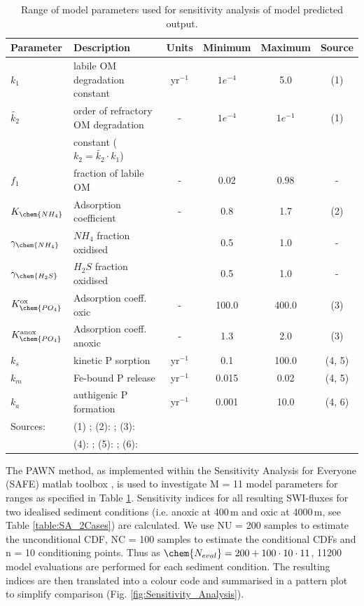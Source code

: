 \documentclass[gmd, manuscript]{copernicus}
\begin{document}
\begin{table}[btp]
\caption{Range of model parameters used for sensitivity analysis of model predicted output.} 
\centering
\begin{tabular}{l l c c c c}
\hline\hline
Parameter & Description & Units & Minimum  & Maximum & Source\\
\hline
$k_1$ & labile OM degradation constant & yr$^{-1}$ & $1e^{-4}$ & 5.0 & (1)\\
$\widetilde{k_2}$ & order of refractory OM degradation & - & $1e^{-4}$ & $1e^{-1}$ &  (1)\\
 & constant ($k_2 = \widetilde{k_2} \cdot k_1$) & & &  &\\
$f_1$ & fraction of labile OM & - & 0.02 & 0.98  & - \\
$K_{\chem{NH_4}}$ & Adsorption coefficient & - & 0.8 & 1.7  & (2) \\
$\gamma_\chem{NH_4}$ & $NH_4$ fraction oxidised &  & 0.5 & 1.0 & - \\
$\gamma_\chem{H_2S}$ &  $H_2S$ fraction oxidised  &  & 0.5 & 1.0 & - \\
$K_\chem{PO_4}^\mathrm{ox}$ & Adsorption coeff. oxic & - & 100.0 & 400.0  & (3) \\
$K_\chem{PO_4}^\mathrm{anox}$ & Adsorption coeff. anoxic & - & 1.3 & 2.0 & (3) \\
$k_{s}$ & kinetic P sorption & yr$^{-1}$  & 0.1 & 100.0 & (4, 5)\\
$k_{m}$ & Fe-bound P release & yr$^{-1}$  & 0.015 & 0.02 & (4, 5)\\
$k_{a}$ & authigenic P formation & yr$^{-1}$  & 0.001 & 10.0 & (4, 6)\\
\hline
Sources: &\multicolumn{5}{l}{(1) \citet{arndt_quantifying_2013}; (2): \citet{cappellen_cycling_1996}; (3): \citet{krom_adsorption_1980}}\\
&\multicolumn{5}{l}{(4): \citet{gypens_simple_2008}; (5): \citet{caroline_p_slomp_key_1996}; (6): \citet{cappellen_mathematical_1988}}
\end{tabular}
\label{table:SA_parameter_ranges}
\end{table}

The PAWN method, as implemented within the Sensitivity Analysis for Everyone (SAFE) matlab toolbox \citep{pianosi_matlab_2015}, is used to investigate M = 11 model parameters for ranges as specified in Table \ref{table:SA_parameter_ranges}. 
Sensitivity indices for all resulting SWI-fluxes for two idealised sediment conditions (i.e. anoxic at 400\,m and oxic at 4000\,m, see Table \ref{table:SA_2Cases}) are calculated. 
We use NU = 200 samples to estimate the unconditional CDF, NC = 100 samples to estimate the conditional CDFs and n = 10 conditioning points. 
Thus as $\chem{N_{eval}}=200+100\cdot10\cdot11$, 11200 model evaluations are performed for each sediment condition. 
The resulting indices are then translated into a colour code and summarised in a pattern plot to simplify comparison (Fig. \ref{fig:Sensitivity_Analysis}). 
\end{document}
